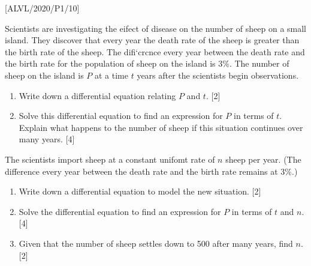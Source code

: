 \item {[}ALVL/2020/P1/10{]}

Scientists are investigating the eifect of disease on the number of
sheep on a small island. They discover that every year the death rate
of the sheep is greater than the birth rate of the sheep. The difi\textquoteleft crcnce
every year between the death rate and the birth rate for the population
of sheep on the island is 3\%. The number of sheep on the island is
$P$ at a time $t$ years after the scientists begin observations. 
\begin{enumerate}
\item Write down a differential equation relating $P$ and $t$.\hfill{}
{[}2{]}
\item Solve this differential equation to find an expression for $P$ in
terms of $t$. Explain what happens to the number of sheep if this
situation continues over many years. \hfill{}{[}4{]}
\end{enumerate}
The scientists import sheep at a constant unifomt rate of $n$ sheep
per year. (The difference every year between the death rate and the
birth rate remains at 3\%.)
\begin{enumerate}
\item Write down a differential equation to model the new situation.\hfill{}
{[}2{]}
\item Solve the differential equation to find an expression for $P$ in
terms of $t$ and $n$. \hfill{}{[}4{]}
\item Given that the number of sheep settles down to 500 after many years,
find $n$. \hfill{}{[}2{]}
\end{enumerate}
